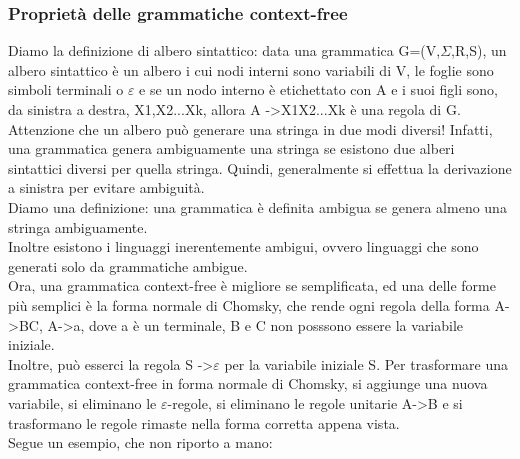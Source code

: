 \documentclass[]{article}
\begin{document}
			\subsubsection{Proprietà delle grammatiche context-free}
				Diamo la definizione di albero sintattico: data una grammatica G=(V,$\Sigma$,R,S), un albero sintattico è un albero i cui nodi interni sono variabili di V, le foglie sono simboli terminali o $\varepsilon$ e se un nodo interno è etichettato con A e i suoi figli sono, da sinistra a destra, X1,X2...Xk, allora A -\textgreater X1X2...Xk è una regola di G.\\
				Attenzione che un albero può generare una stringa in due modi diversi! Infatti, una grammatica genera ambiguamente una stringa se esistono due alberi sintattici diversi per quella stringa. Quindi, generalmente si effettua la derivazione a sinistra per evitare ambiguità.\\
				Diamo una definizione: una grammatica è definita ambigua se genera almeno una stringa ambiguamente.\\
				Inoltre esistono i linguaggi inerentemente ambigui, ovvero linguaggi che sono generati solo da grammatiche ambigue.\\
				Ora, una grammatica context-free è migliore se semplificata, ed una delle forme più semplici è la forma normale di Chomsky, che rende ogni regola della forma A-\textgreater BC, A-\textgreater a, dove a è un terminale, B e C non posssono essere la variabile iniziale.\\ Inoltre, può esserci la regola S -\textgreater $\varepsilon$ per la variabile iniziale S. Per trasformare una grammatica context-free in forma normale di Chomsky, si aggiunge una nuova variabile, si eliminano le $\varepsilon$-regole, si eliminano le regole unitarie A-\textgreater B e si trasformano le regole rimaste nella forma corretta appena vista.\\
				Segue un esempio, che non riporto a mano:\\
\end{document}
